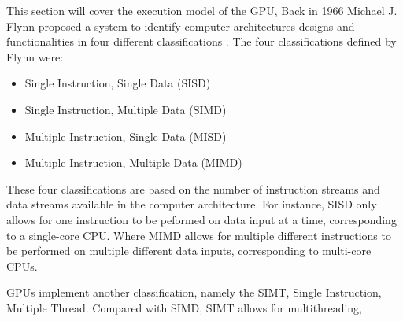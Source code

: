 This section will cover the execution model of the GPU, 
Back in 1966 Michael J. Flynn proposed  a system to identify computer architectures designs and functionalities in four different classifications \cite{Flynn1972}. 
The four classifications defined by Flynn were:

\begin{itemize}
	\item Single Instruction, Single Data (SISD)
	\item Single Instruction, Multiple Data (SIMD)
	\item Multiple Instruction, Single Data (MISD)
	\item Multiple Instruction, Multiple Data (MIMD)
\end{itemize}

These four classifications are based on the number of instruction streams and data streams available in the computer architecture.
For instance, SISD only allows for one instruction to be peformed on data input at a time, corresponding to a single-core CPU.
Where MIMD allows for multiple different instructions to be performed on multiple different data inputs, corresponding to multi-core CPUs.

GPUs implement another classification, namely the SIMT, Single Instruction, Multiple Thread.
Compared with SIMD, SIMT allows for multithreading, 



